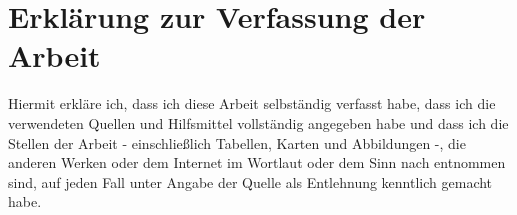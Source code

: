 \chapter*{Erklärung zur Verfassung der Arbeit}

Hiermit erkläre ich, dass ich diese Arbeit selbständig verfasst habe, 
dass ich die verwendeten Quellen und Hilfsmittel vollständig angegeben 
habe und dass ich die Stellen der Arbeit - einschließlich Tabellen, 
Karten und Abbildungen -, die anderen Werken oder dem Internet im 
Wortlaut oder dem Sinn nach entnommen sind, auf jeden Fall unter Angabe 
der Quelle als Entlehnung kenntlich gemacht habe.\\


